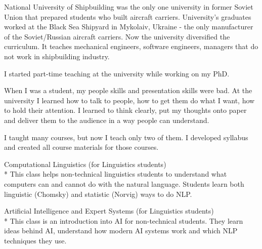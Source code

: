 \documentclass[12pt]{letter}
\begin{document}
\begin{llist}
  \endexperience






  \startexperience

            \item National University of Shipbuilding was the only one university in former Soviet Union that prepared students who built aircraft carriers. University's graduates worked at the Black Sea Shipyard in Mykolaiv, Ukraine - the only manufacturer of the Soviet/Russian aircraft carriers. Now the university diversified the curriculum. It teaches mechanical engineers, software engineers, managers that do not work in shipbuilding industry.

            \item I started part-time teaching at the university while working on my PhD.

            \item When I was a student, my people skills and presentation skills were bad. At the university I learned how to talk to people, how to get them do what I want, how to hold their attention. I learned to think clearly, put my thoughts onto paper and deliver them to the audience in a way people can understand.

            \item I taught many courses, but now I teach only two of them. I developed syllabus and created all course materials for those courses.

            \item Computational Linguistics (for Linguistics students)\\*
            This class helps non-technical linguistics students to understand what computers can and cannot do with the natural language. Students learn both linguistic (Chomsky) and statistic (Norvig) ways to do NLP.

            \item Artificial Intelligence and Expert Systems (for Linguistics students)\\*
            This class is an introduction into AI for non-technical students. They learn ideas behind AI, understand how modern AI systems work and which NLP techniques they use.


\end{llist}
\end{document}
